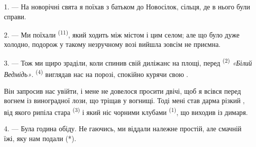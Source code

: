 %
%


\VUsaut{4.0mm}
\VUsaut{3.0mm}
\VUfilet{16mm}
\VUsaut{5.6mm}
\VUsaut{3.0mm}

\VUsaut{3.0mm}

\VUsaut{4.0mm}

1. --- На новорічні свята я поїхав з батьком до Новосілок, сільця, де в нього
були справи.

2. --- Ми поїхали  \textsuperscript{(11)}, який ходить між
містом і цим селом; але що було дуже холодно, подорож у такому незручному
возі вийшла зовсім не приємна.

3. --- Тож ми щиро зраділи, коли  спинив свій диліжанс на площі,
перед  \textsuperscript{(2)} \textit{«Білий Ведмідь»}.
 \textsuperscript{(4)} виглядав нас на порозі, спокійно курячи
свою .

Він запросив нас увійти, і мене не довелося просити двічі, щоб я всівся перед
вогнем із виноградної лози, що тріщав у вогнищі. Тоді мені став дарма різкий
, від якого рипіла стара 
\textsuperscript{(3)} і який ніс чорними клубами 
\textsuperscript{(1)}, що виходив із димаря.

4. --- Була година обіду. Не гаючись, ми віддали належне простій, але смачній
їжі, яку нам подали (*).

